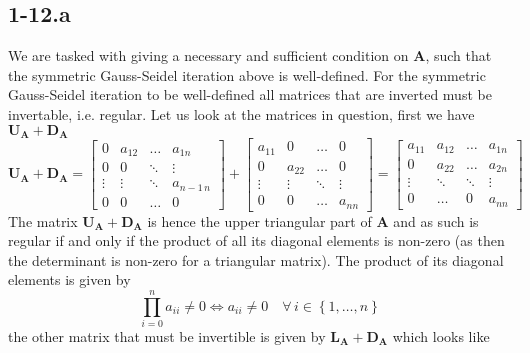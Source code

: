 \documentclass{article}
\newcommand\DA{\mathbf{D}_{\mathbf{A}}}
\newcommand\LA{\mathbf{L}_{\mathbf{A}}}
\newcommand\UA{\mathbf{U}_{\mathbf{A}}}
\begin{document}
\subsection*{1-12.a}
We are tasked with giving a necessary and sufficient condition on $\mathbf{A}$, such that the symmetric Gauss-Seidel iteration above is well-defined. For the symmetric Gauss-Seidel iteration to be well-defined all matrices that are inverted must be invertable, i.e. regular. Let us look at the matrices in question, first we have $\UA + \DA$
\begin{equation*}
    \UA + \DA = 
    \begin{bmatrix}
    0 & a_{12} & \dots & a_{1n} \\
    0 & 0 & \ddots & \vdots \\
    \vdots & \vdots &  \ddots& a_{n-1\,n} \\
    0 & 0 & \dots & 0
    \end{bmatrix}+\begin{bmatrix}
        a_{11} & 0 & \dots & 0 \\
    0 & a_{22} & \dots & 0 \\
    \vdots & \vdots & \ddots & \vdots \\
   0& 0 & \dots & a_{nn}
    \end{bmatrix} = \begin{bmatrix}
    a_{11} & a_{12} & \dots & a_{1n} \\
    0 & a_{22} & \dots & a_{2n} \\
    \vdots & \ddots &  \ddots& \vdots \\
   0 & \dots & 0 & a_{nn}
    \end{bmatrix}
\end{equation*}
The matrix $\UA + \DA$ is hence the upper triangular part of $\mathbf{A}$ and as such is regular if and only if the product of all its diagonal elements is non-zero (as then the determinant is non-zero for a triangular matrix). The product of its diagonal elements is given by
\begin{equation*}
    \prod_{i=0}^{n} a_{ii} \neq 0 \Longleftrightarrow a_{ii} \neq 0 \quad \forall \, i \in \left\{1, \dots, n\right\}
\end{equation*}
the other matrix that must be invertible is given by $\LA + \DA$ which looks like
\end{document}
